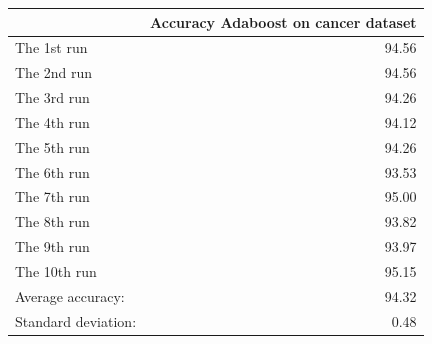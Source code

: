 \begin{tabular}{lr}
\toprule
{} &  Accuracy Adaboost on cancer dataset \\
\midrule
The 1st run         &                                94.56 \\
The 2nd run         &                                94.56 \\
The 3rd run         &                                94.26 \\
The 4th run         &                                94.12 \\
The 5th run         &                                94.26 \\
The 6th run         &                                93.53 \\
The 7th run         &                                95.00 \\
The 8th run         &                                93.82 \\
The 9th run         &                                93.97 \\
The 10th run        &                                95.15 \\
Average accuracy:   &                                94.32 \\
Standard deviation: &                                 0.48 \\
\bottomrule
\end{tabular}
